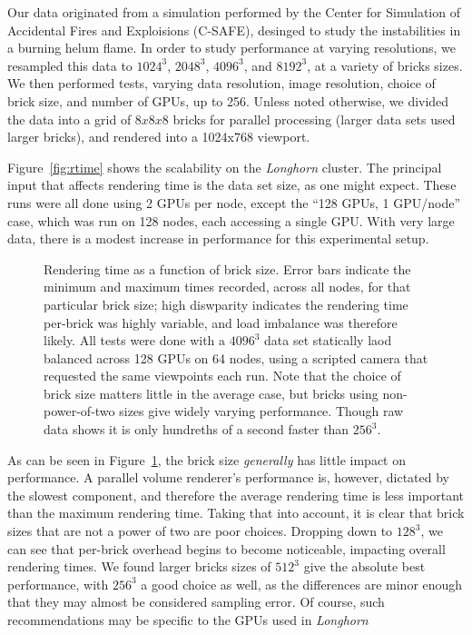 Our data originated from a simulation performed by the Center for Simulation of
Accidental Fires and Exploisions (C-SAFE), desinged to study the instabilities
in a burning helum flame.  In order to study performance at varying
resolutions, we resampled this data to $1024^3$, $2048^3$, $4096^3$, and
$8192^3$, at a variety of bricks sizes.  We then performed tests, varying data
resolution, image resolution, choice of brick size, and number of GPUs, up to
256.  Unless noted otherwise, we divided the data into a grid of $8x8x8$ bricks
for parallel processing (larger data sets used larger bricks), and rendered
into a 1024x768 viewport.

Figure~\ref{fig:rtime} shows the scalability on the \textit{Longhorn}
cluster.  The principal input that affects rendering time is the data
set size, as one might expect.  These runs were all done using 2 GPUs
per node, except the ``128 GPUs, 1 GPU/node'' case, which was run on
128 nodes, each accessing a single GPU.  With very large data, there is
a modest increase in performance for this experimental setup.

\begin{figure}

  \caption{Rendering time as a function of brick size.  Error bars
  indicate the minimum and maximum times recorded, across all nodes,
  for that particular brick size; high diswparity indicates the
  rendering time per-brick was highly variable, and load imbalance
  was therefore likely.  All tests were done with a $4096^3$ data
  set statically laod balanced across 128 GPUs on 64 nodes, using a
  scripted camera that requested the same viewpoints each run.  Note
  that the choice of brick size matters little in the average case, but
  bricks using non-power-of-two sizes give widely varying performance.
  Though raw data shows it is only hundreths of a second faster than
  $256^3$.}
  \label{fig:bsize}
\end{figure}

As can be seen in Figure~\ref{fig:bsize}, the brick size
\emph{generally} has little impact on performance.  A parallel volume
renderer's performance is, however, dictated by the slowest component,
and therefore the average rendering time is less important than the
maximum rendering time.  Taking that into account, it is clear that
brick sizes that are not a power of two are poor choices.  Dropping
down to $128^3$, we can see that per-brick overhead begins to become
noticeable, impacting overall rendering times.  We found larger bricks
sizes of $512^3$ give the absolute best performance, with $256^3$ a
good choice as well, as the differences are minor enough that they may
almost be considered sampling error.  Of course, such recommendations
may be specific to the GPUs
used in \textit{Longhorn}

